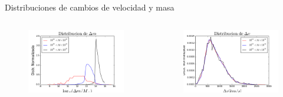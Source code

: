 \documentclass{beamer}
\begin{document}
\begin{frame}{Distribuciones de cambios de velocidad y masa}
	\begin{columns}
		\begin{column}{0.5\textwidth}
			\begin{figure}[!h]
			\begin{center}
				\includegraphics[width=\textwidth]{im/deltammas}
				\label{fig:mm1}
			\end{center}
		\end{figure}
		\end{column}
		
		\begin{column}{0.5\textwidth}
			\begin{figure}[!h]
			\begin{center}
				\includegraphics[width=\textwidth]{im/deltavmas}
				\label{fig:vv1}
			\end{center}
		\end{figure}
		\end{column}
	\end{columns}
\end{frame}
\end{document}
